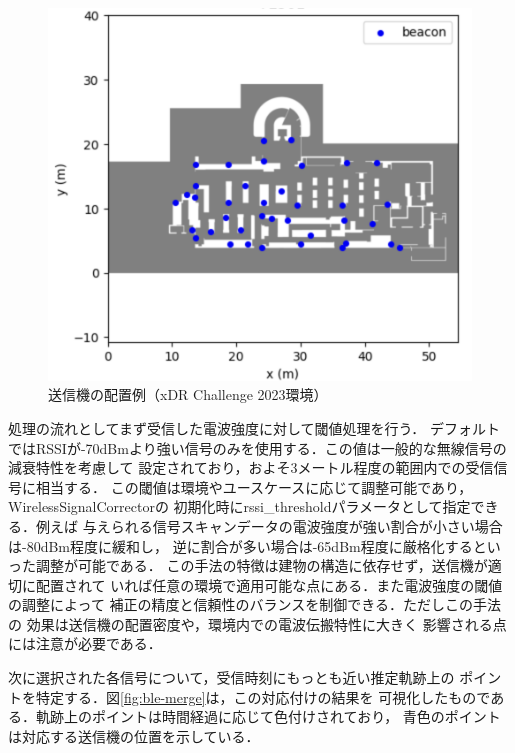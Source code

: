 \begin{figure}[H]
    \centering
    \includegraphics[width=\linewidth]{../image/ble-beacon-position.jpg}
    \caption{送信機の配置例（xDR Challenge 2023環境）}    \label{fig:ble-beacon-position}
\end{figure}


処理の流れとしてまず受信した電波強度に対して閾値処理を行う．
デフォルトではRSSIが-70dBmより強い信号のみを使用する．この値は一般的な無線信号の減衰特性を考慮して
設定されており，およそ3メートル程度の範囲内での受信信号に相当する．
この閾値は環境やユースケースに応じて調整可能であり，WirelessSignalCorrectorの
初期化時にrssi\_thresholdパラメータとして指定できる．例えば
与えられる信号スキャンデータの電波強度が強い割合が小さい場合は-80dBm程度に緩和し，
逆に割合が多い場合は-65dBm程度に厳格化するといった調整が可能である．
この手法の特徴は建物の構造に依存せず，送信機が適切に配置されて
いれば任意の環境で適用可能な点にある．また電波強度の閾値の調整によって
補正の精度と信頼性のバランスを制御できる．ただしこの手法の
効果は送信機の配置密度や，環境内での電波伝搬特性に大きく
影響される点には注意が必要である．

次に選択された各信号について，受信時刻にもっとも近い推定軌跡上の
ポイントを特定する．図\ref{fig:ble-merge}は，この対応付けの結果を
可視化したものである．軌跡上のポイントは時間経過に応じて色付けされており，
青色のポイントは対応する送信機の位置を示している．


